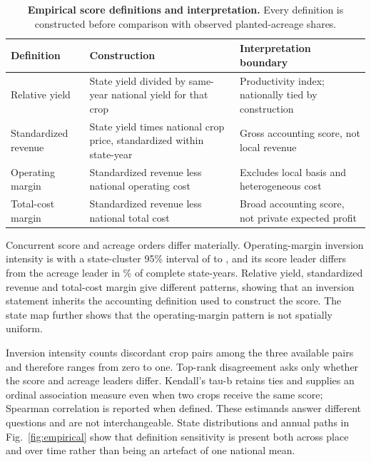\begin{table}[t]
\centering
\caption{\textbf{Empirical score definitions and interpretation.} Every definition is constructed before comparison with observed planted-acreage shares.}
\label{tab:scores}
\small
\begin{tabularx}{\textwidth}{>{\raggedright\arraybackslash}p{3.2cm}>{\raggedright\arraybackslash}X>{\raggedright\arraybackslash}p{4.0cm}}
\toprule
Definition & Construction & Interpretation boundary \\
\midrule
Relative yield & State yield divided by same-year national yield for that crop & Productivity index; nationally tied by construction \\
Standardized revenue & State yield times national crop price, standardized within state-year & Gross accounting score, not local revenue \\
Operating margin & Standardized revenue less national operating cost & Excludes local basis and heterogeneous cost \\
Total-cost margin & Standardized revenue less national total cost & Broad accounting score, not private expected profit \\
\bottomrule
\end{tabularx}
\end{table}

Concurrent score and acreage orders differ materially. Operating-margin inversion intensity is \OperatingInversion{} with a state-cluster 95\% interval of \OperatingInversionLow{} to \OperatingInversionHigh{}, and its score leader differs from the acreage leader in \OperatingTopRate{}\% of complete state-years. Relative yield, standardized revenue and total-cost margin give different patterns, showing that an inversion statement inherits the accounting definition used to construct the score. The state map further shows that the operating-margin pattern is not spatially uniform.

Inversion intensity counts discordant crop pairs among the three available pairs and therefore ranges from zero to one. Top-rank disagreement asks only whether the score and acreage leaders differ. Kendall's tau-b retains ties and supplies an ordinal association measure even when two crops receive the same score; Spearman correlation is reported when defined. These estimands answer different questions and are not interchangeable. State distributions and annual paths in Fig.~\ref{fig:empirical} show that definition sensitivity is present both across place and over time rather than being an artefact of one national mean.

